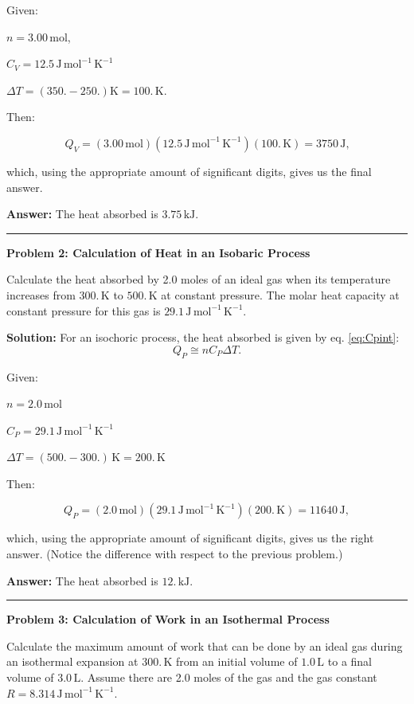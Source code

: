 \documentclass[
  9pt,
]{extbook}
\theoremstyle{definition}
\theoremstyle{definition}
\theoremstyle{definition}
\theoremstyle{definition}
\theoremstyle{remark}
\begin{document}
Given:

\(n=3.00 \, \text{mol}\),

\(C_V=12.5 \, \text{J} \, \text{mol}^{-1} \, \text{K}^{-1}\)

\(\Delta T = (350.-250.) \text{K}=100.\, \text{K}\).

Then:

\[Q_V=(3.00 \, \text{mol})(12.5\,\text{J} \, \text{mol}^{-1} \, \text{K}^{-1})(100.\,\text{K})=3750\,\text{J,}\]

which, using the appropriate amount of significant digits, gives us the final answer.

\textbf{Answer:} The heat absorbed is \(3.75\,\text{kJ}.\)

\begin{center}\rule{0.5\linewidth}{0.5pt}\end{center}

\textbf{Problem 2: Calculation of Heat in an Isobaric Process}

Calculate the heat absorbed by 2.0 moles of an ideal gas when its temperature increases from \(300. \,\text{K}\) to \(500. \,\text{K}\) at constant pressure. The molar heat capacity at constant pressure for this gas is \(29.1 \, \text{J} \, \text{mol}^{-1} \, \text{K}^{-1}\).

\textbf{Solution:} For an isochoric process, the heat absorbed is given by eq. \eqref{eq:Cpint}: \[  Q_P \cong n C_P \Delta T.\]

Given:

\(n=2.0\,\text{mol}\)

\(C_P =29.1 \, \text{J} \, \text{mol}^{-1} \, \text{K}^{-1}\)

\(\Delta T= (500.-300.)\,\text{K}=200.\,\text{K}\)

Then:

\[Q_P=(2.0\,\text{mol})(29.1\,\text{J} \, \text{mol}^{-1} \, \text{K}^{-1})(200.\,\text{K}) = 11640\,\text{J},\]

which, using the appropriate amount of significant digits, gives us the right answer. (Notice the difference with respect to the previous problem.)

\textbf{Answer:} The heat absorbed is \(12.\, \text{kJ}.\)

\begin{center}\rule{0.5\linewidth}{0.5pt}\end{center}

\textbf{Problem 3: Calculation of Work in an Isothermal Process}

Calculate the maximum amount of work that can be done by an ideal gas during an isothermal expansion at \(300.\, \text{K}\) from an initial volume of \(1.0\,\text{L}\) to a final volume of \(3.0\,\text{L}\). Assume there are 2.0 moles of the gas and the gas constant \(R=8.314\, \text{J} \, \text{mol}^{-1} \, \text{K}^{-1}\).
\end{document}
